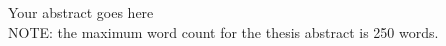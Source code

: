 
  













\thesisabstract
{
Your abstract goes here \\
NOTE: the maximum word count for the thesis abstract is 250 words.
}


